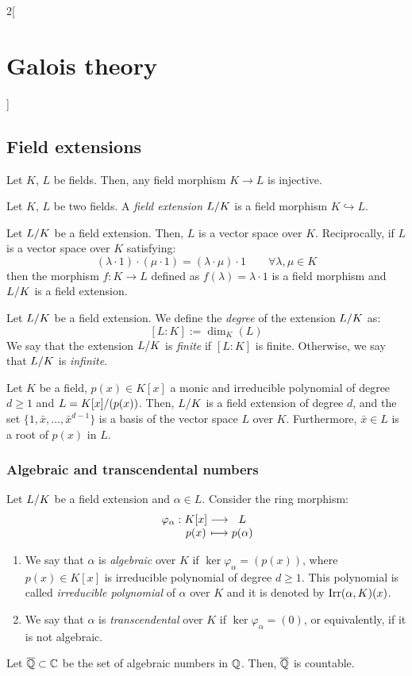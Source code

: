 \documentclass[../../../main.tex]{subfiles}
\begin{document}
\begin{multicols}{2}[\section{Galois theory}]
  \subsection{Field extensions}
  \begin{prop}
    Let $K$, $L$ be fields. Then, any field morphism $K\rightarrow L$ is injective.
  \end{prop}
  \begin{definition}
    Let $K$, $L$ be two fields. A \emph{field extension} $\quot{L}{K}$ is a field morphism $K\hookrightarrow L$.
  \end{definition}
  \begin{prop}
    Let $\quot{L}{K}$ be a field extension. Then, $L$ is a vector space over $K$. Reciprocally, if $L$ is a vector space over $K$ satisfying: $$(\lambda\cdot 1)\cdot(\mu\cdot 1)=(\lambda\cdot\mu)\cdot 1\qquad\forall\lambda,\mu\in K$$ then the morphism $f:K\rightarrow L$ defined as $f(\lambda)=\lambda\cdot 1$ is a field morphism and $\quot{L}{K}$ is a field extension.
  \end{prop}
  \begin{definition}
    Let $\quot{L}{K}$ be a field extension. We define the \emph{degree} of the extension $\quot{L}{K}$ as: $$[L:K]:=\dim_K(L)$$ We say that the extension $\quot{L}{K}$ is \emph{finite} if $[L:K]$ is finite. Otherwise, we say that $\quot{L}{K}$ is \emph{infinite}.
  \end{definition}
  \begin{lemma}
    Let $K$ be a field, $p(x)\in K[x]$ a monic and irreducible polynomial of degree $d\geq 1$ and $L=\quot{K[x]}{(p(x))}$. Then, $\quot{L}{K}$ is a field extension of degree $d$, and the set $\{1,\bar{x},\ldots,{\bar{x}}^{d-1}\}$ is a basis of the vector space $L$ over $K$. Furthermore, $\bar{x}\in L$ is a root of $p(x)$ in $L$.
  \end{lemma}
  \subsubsection{Algebraic and transcendental numbers}
  \begin{definition}
    Let $\quot{L}{K}$ be a field extension and $\alpha\in L$. Consider the ring morphism: $$\function{\varphi_\alpha}{K[x]}{L}{p(x)}{p(\alpha)}$$
    \begin{enumerate}
      \item We say that $\alpha$ is \emph{algebraic} over $K$ if $\ker\varphi_\alpha=(p(x))$, where $p(x)\in K[x]$ is irreducible polynomial of degree $d\geq 1$. This polynomial is called \emph{irreducible polynomial} of $\alpha$ over $K$ and it is denoted by $\operatorname{Irr}(\alpha,K)(x)$.
      \item We say that $\alpha$ is \emph{transcendental} over $K$ if $\ker\varphi_\alpha=(0)$, or equivalently, if it is not algebraic.
    \end{enumerate}
  \end{definition}
  \begin{theorem}
    Let $\overline{\mathbb{Q}}\subset\mathbb{C}$ be the set of algebraic numbers in $\mathbb{Q}$. Then, $\overline{\mathbb{Q}}$ is countable.
  \end{theorem}

\end{multicols}
\end{document}
